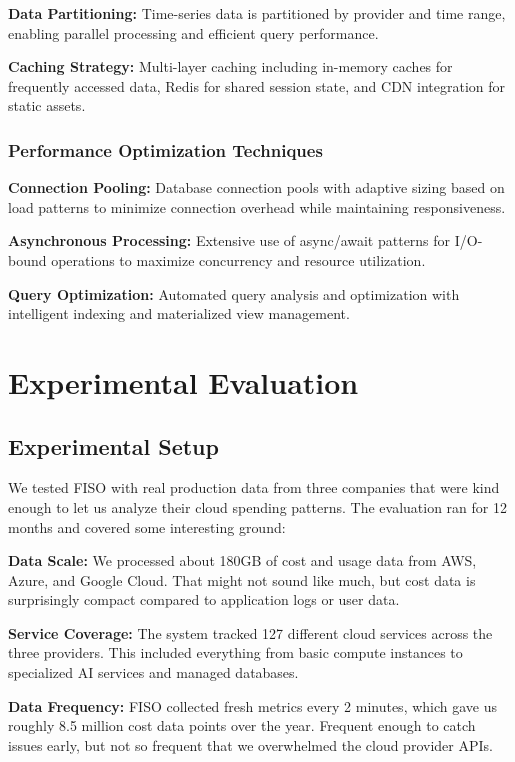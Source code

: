 \documentclass[conference]{IEEEtran}
\begin{document}
\textbf{Data Partitioning:} Time-series data is partitioned by provider and time range, enabling parallel processing and efficient query performance.

\textbf{Caching Strategy:} Multi-layer caching including in-memory caches for frequently accessed data, Redis for shared session state, and CDN integration for static assets.

\subsubsection{Performance Optimization Techniques}

\textbf{Connection Pooling:} Database connection pools with adaptive sizing based on load patterns to minimize connection overhead while maintaining responsiveness.

\textbf{Asynchronous Processing:} Extensive use of async/await patterns for I/O-bound operations to maximize concurrency and resource utilization.

\textbf{Query Optimization:} Automated query analysis and optimization with intelligent indexing and materialized view management.

\section{Experimental Evaluation}

\subsection{Experimental Setup}

We tested FISO with real production data from three companies that were kind enough to let us analyze their cloud spending patterns. The evaluation ran for 12 months and covered some interesting ground:

\textbf{Data Scale:} We processed about 180GB of cost and usage data from AWS, Azure, and Google Cloud. That might not sound like much, but cost data is surprisingly compact compared to application logs or user data.

\textbf{Service Coverage:} The system tracked 127 different cloud services across the three providers. This included everything from basic compute instances to specialized AI services and managed databases.

\textbf{Data Frequency:} FISO collected fresh metrics every 2 minutes, which gave us roughly 8.5 million cost data points over the year. Frequent enough to catch issues early, but not so frequent that we overwhelmed the cloud provider APIs.
\end{document}
